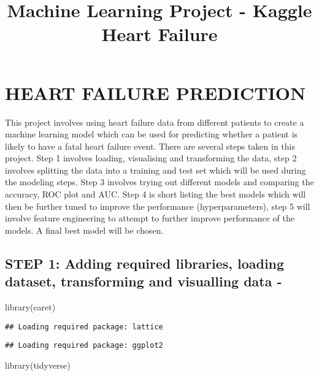 \documentclass[
]{article}
\title{Machine Learning Project - Kaggle Heart Failure}
\author{}
\date{\vspace{-2.5em}}
\newenvironment{Shaded}{\begin{snugshade}}{\end{snugshade}}
\newcommand{\FunctionTok}[1]{\textcolor[rgb]{0.00,0.00,0.00}{#1}}
\newcommand{\NormalTok}[1]{#1}
\begin{document}
\maketitle

\hypertarget{heart-failure-prediction}{%
\section{HEART FAILURE PREDICTION}\label{heart-failure-prediction}}

This project involves using heart failure data from different patients
to create a machine learning model which can be used for predicting
whether a patient is likely to have a fatal heart failure event. There
are several steps taken in this project. Step 1 involves loading,
visualising and transforming the data, step 2 involves splitting the
data into a training and test set which will be used during the modeling
steps. Step 3 involves trying out different models and comparing the
accuracy, ROC plot and AUC. Step 4 is short listing the best models
which will then be further tuned to improve the performance
(hyperparameters), step 5 will involve feature engineering to attempt to
further improve performance of the models. A final best model will be
chosen.

\hypertarget{step-1-adding-required-libraries-loading-dataset-transforming-and-visualling-data--}{%
\subsection{STEP 1: Adding required libraries, loading dataset,
transforming and visualling data
-}\label{step-1-adding-required-libraries-loading-dataset-transforming-and-visualling-data--}}

\begin{Shaded}
\begin{Highlighting}[]
\FunctionTok{library}\NormalTok{(caret)}
\end{Highlighting}
\end{Shaded}

\begin{verbatim}
## Loading required package: lattice
\end{verbatim}

\begin{verbatim}
## Loading required package: ggplot2
\end{verbatim}

\begin{Shaded}
\begin{Highlighting}[]
\FunctionTok{library}\NormalTok{(tidyverse)}
\end{Highlighting}
\end{Shaded}
\end{document}
